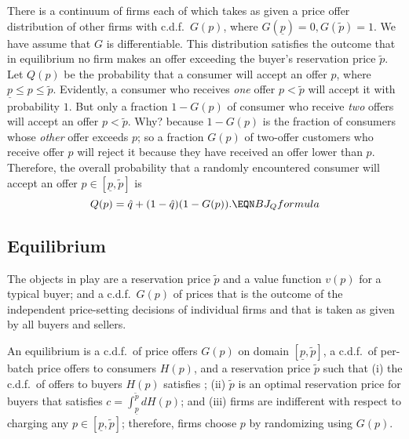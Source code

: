 There is a continuum of firms each of which takes as given  a price offer distribution of other firms  with c.d.f.\ $G(p)$, where
$G(\underline p) = 0, G(\tilde p) = 1$.  We have assume that  $G$ is differentiable. This distribution
    satisfies  the outcome that in equilibrium no firm  makes an offer exceeding
the buyer's reservation price $\tilde p$.  Let $Q(p)$ be the probability that a consumer will accept an offer  $p$,
where $ \underline p \leq p \leq \tilde p$.  Evidently, a consumer who receives {\it one\/} offer  $p < \tilde p$ will accept it
with probability $1$.  But only  a fraction $1-G(p)$ of consumer who receive {\it two\/} offers will accept an offer  $ p < \tilde p$.  Why?
because $1 - G(p)$ is the fraction of consumers whose {\it other} offer exceeds $p$; so a fraction $G(p)$ of two-offer customers who receive offer $p$ will reject it because they have received an offer lower
than $p$.     Therefore,
the overall probability that a randomly encountered consumer will accept an offer  $ p \in [\underline p, \tilde p]$
is
$$ Q(p) = \hat q + (1-\hat q) (1-G(p)) . \EQN BJ_Qformula $$

\subsection{Equilibrium}

The  objects in play are a reservation price $\tilde p$ and  a value function $v(p)$  for a typical buyer; and
a c.d.f.\ $G(p)$  of prices that is the outcome of the independent price-setting decisions of individual firms and that is   taken as given by all buyers and  sellers.

\medskip

An equilibrium is a c.d.f.\ of price offers $G(p)$ on domain $[\underline p, \tilde p]$, a c.d.f.\ of  per-batch price offers to consumers $H(p)$, and a reservation price $\tilde p$ such that (i) the  c.d.f.\ of offers to buyers  $H(p)$ satisfies  ; (ii) $\tilde p$
is an optimal reservation price for buyers that satisfies
$  c = \int_{\underline p}^{\tilde p} d H(p)  $; and (iii) firms are indifferent with respect to charging any
$p \in [\underline p, \tilde p]$; therefore, firms choose $p$ by randomizing using $G(p)$.

